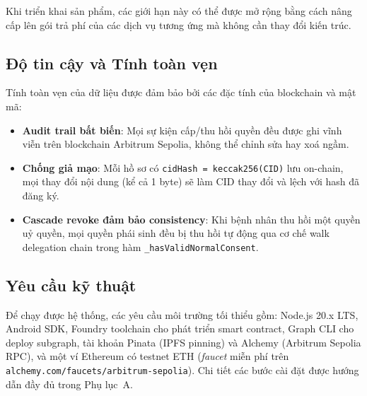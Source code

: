 \documentclass[../DoAn]{subfiles}
\begin{document}
Khi triển khai sản phẩm, các giới hạn này có thể được mở rộng bằng cách nâng cấp lên gói trả phí của các dịch vụ tương ứng mà không cần thay đổi kiến trúc.

\subsection{Độ tin cậy và Tính toàn vẹn}

Tính toàn vẹn của dữ liệu được đảm bảo bởi các đặc tính của blockchain và mật mã:

\begin{itemize}
    \item \textbf{Audit trail bất biến}: Mọi sự kiện cấp/thu hồi quyền đều được ghi vĩnh viễn trên blockchain Arbitrum Sepolia, không thể chỉnh sửa hay xoá ngầm.
    \item \textbf{Chống giả mạo}: Mỗi hồ sơ có \texttt{cidHash = keccak256(CID)} lưu on-chain, mọi thay đổi nội dung (kể cả 1 byte) sẽ làm CID thay đổi và lệch với hash đã đăng ký.
    \item \textbf{Cascade revoke đảm bảo consistency}: Khi bệnh nhân thu hồi một quyền uỷ quyền, mọi quyền phái sinh đều bị thu hồi tự động qua cơ chế walk delegation chain trong hàm \texttt{\_hasValidNormalConsent}.
\end{itemize}

\subsection{Yêu cầu kỹ thuật}

Để chạy được hệ thống, các yêu cầu môi trường tối thiểu gồm: Node.js 20.x LTS, Android SDK, Foundry toolchain cho phát triển smart contract, Graph CLI cho deploy subgraph, tài khoản Pinata (IPFS pinning) và Alchemy (Arbitrum Sepolia RPC), và một ví Ethereum có testnet ETH (\textit{faucet} miễn phí trên \texttt{alchemy.com/faucets/arbitrum-sepolia}). Chi tiết các bước cài đặt được hướng dẫn đầy đủ trong Phụ lục~A.
\end{document}
